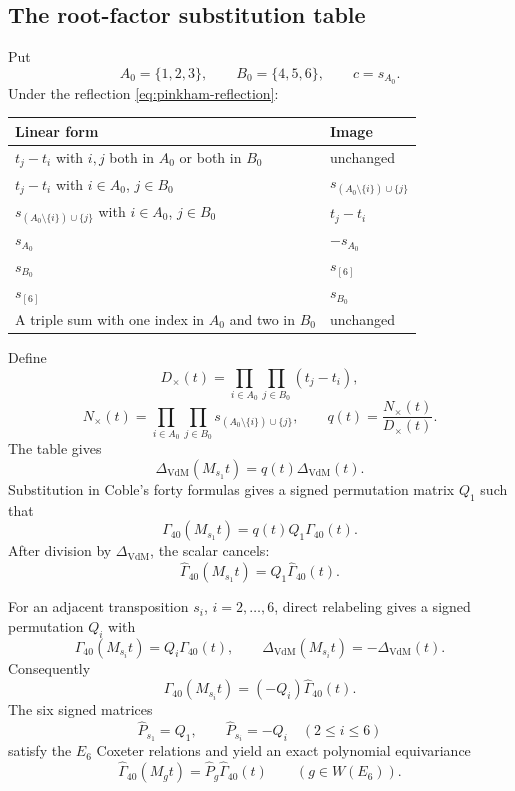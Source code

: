 \documentclass[11pt]{article}
\newcommand{\Gamhat}{\widehat{\Gamma}}
\newcommand{\Deltav}{\Delta_{\mathrm{VdM}}}
\begin{document}
\subsection{The root-factor substitution table}

Put
\[
  A_0=\{1,2,3\},\qquad B_0=\{4,5,6\},\qquad c=s_{A_0}.
\]
Under the reflection \eqref{eq:pinkham-reflection}:

\begin{center}
\renewcommand{\arraystretch}{1.18}
\begin{tabular}{>{\raggedright\arraybackslash}p{}
                >{\raggedright\arraybackslash}p{}}
\toprule
Linear form & Image \\
\midrule
$t_j-t_i$ with $i,j$ both in $A_0$ or both in $B_0$
  & unchanged \\
$t_j-t_i$ with $i\in A_0$, $j\in B_0$
  & $s_{(A_0\setminus\{i\})\cup\{j\}}$ \\
$s_{(A_0\setminus\{i\})\cup\{j\}}$ with $i\in A_0$, $j\in B_0$
  & $t_j-t_i$ \\
$s_{A_0}$ & $-s_{A_0}$ \\
$s_{B_0}$ & $s_{[6]}$ \\
$s_{[6]}$ & $s_{B_0}$ \\
A triple sum with one index in $A_0$ and two in $B_0$
  & unchanged \\
\bottomrule
\end{tabular}
\end{center}

Define
\[
 D_\times(t)=\prod_{i\in A_0}\prod_{j\in B_0}(t_j-t_i),
\]
\[
 N_\times(t)=
 \prod_{i\in A_0}\prod_{j\in B_0}
 s_{(A_0\setminus\{i\})\cup\{j\}},
 \qquad
 q(t)=\frac{N_\times(t)}{D_\times(t)}.
\]
The table gives
\begin{equation}
  \Deltav(M_{s_1}t)=q(t)\Deltav(t).
  \label{eq:vandermonde-transform}
\end{equation}
Substitution in Coble's forty formulas gives a signed permutation matrix $Q_1$ such
that
\[
  \Gamma_{40}(M_{s_1}t)=q(t)Q_1\Gamma_{40}(t).
\]
After division by $\Deltav$, the scalar cancels:
\begin{equation}
  \Gamhat_{40}(M_{s_1}t)=Q_1\Gamhat_{40}(t).
  \label{eq:exact-cremona}
\end{equation}

For an adjacent transposition $s_i$, $i=2,\ldots,6$, direct relabeling gives a
signed permutation $Q_i$ with
\[
  \Gamma_{40}(M_{s_i}t)=Q_i\Gamma_{40}(t),
  \qquad
  \Deltav(M_{s_i}t)=-\Deltav(t).
\]
Consequently
\begin{equation}
  \Gamhat_{40}(M_{s_i}t)=(-Q_i)\Gamhat_{40}(t).
  \label{eq:exact-symmetric}
\end{equation}
The six signed matrices
\[
  \widehat P_{s_1}=Q_1,
  \qquad
  \widehat P_{s_i}=-Q_i\quad(2\leq i\leq6)
\]
satisfy the $E_6$ Coxeter relations and yield an exact polynomial equivariance
\begin{equation}
  \Gamhat_{40}(M_gt)=\widehat P_g\Gamhat_{40}(t)
  \qquad(g\in W(E_6)).
  \label{eq:exact-equivariance}
\end{equation}
\end{document}
